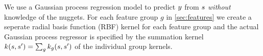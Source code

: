 We use a Gaussian process regression model \citep{rasmussen2004gaussian}
to predict $y$ from $s$ 
\emph{without} knowledge of the nuggets. 
For each feature group $g$ in \autoref{sec:features} we create a seperate
radial basis function (RBF) kernel for each feature group and the 
 actual Gaussian process regressor is specified by 
the summation kernel 
$k(s, s^\prime) = \sum_g k_g(s, s^\prime)$
of the individual group kernels.







